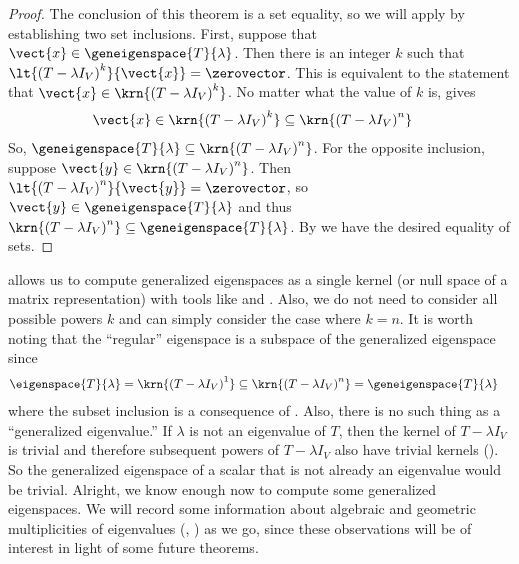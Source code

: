 %
\begin{proof}
The conclusion of this theorem is a set equality, so we will apply  by establishing two set inclusions.  First, suppose that $\vect{x}\in\geneigenspace{T}{\lambda}$.  Then there is an integer $k$ such that $\lt{\left(T-\lambda I_V\right)^k}{\vect{x}}=\zerovector$.  This is equivalent to the statement that $\vect{x}\in\krn{\left(T-\lambda I_V\right)^k}$.  No matter what the value of $k$ is,  gives
%
\begin{align*}
\vect{x}&\in\krn{\left(T-\lambda I_V\right)^k}\subseteq\krn{\left(T-\lambda I_V\right)^n}
\end{align*}
%
So, $\geneigenspace{T}{\lambda}\subseteq\krn{\left(T-\lambda I_V\right)^n}$.  For the opposite inclusion, suppose $\vect{y}\in\krn{\left(T-\lambda I_V\right)^n}$.  Then $\lt{\left(T-\lambda I_V\right)^n}{\vect{y}}=\zerovector$, so $\vect{y}\in\geneigenspace{T}{\lambda}$ and thus $\krn{\left(T-\lambda I_V\right)^n}\subseteq\geneigenspace{T}{\lambda}$.  By  we have the desired equality of sets.
%
\end{proof}
%
 allows us to compute generalized eigenspaces as a single kernel (or null space of a matrix representation) with tools like  and .  Also, we do not need to consider all possible powers $k$ and can simply consider the case where $k=n$.  It is worth noting that the ``regular'' eigenspace is a subspace of the generalized eigenspace since
%
\begin{align*}
\eigenspace{T}{\lambda}
&=\krn{\left(T-\lambda I_V\right)^1}
\subseteq\krn{\left(T-\lambda I_V\right)^n}
=\geneigenspace{T}{\lambda}
\end{align*}
%
where the subset inclusion is a consequence of .  Also, there is no such thing as a ``generalized eigenvalue.'' If $\lambda$ is not an eigenvalue of $T$, then the kernel of $T-\lambda I_V$ is trivial and therefore subsequent powers of $T-\lambda I_V$ also have trivial kernels ().  So the generalized eigenspace of a scalar that is not already an eigenvalue would be trivial.  Alright, we know enough now to compute some generalized eigenspaces.  We will record some information about algebraic and geometric multiplicities of eigenvalues (, ) as we go, since these observations will be of interest in light of some future theorems.
%

